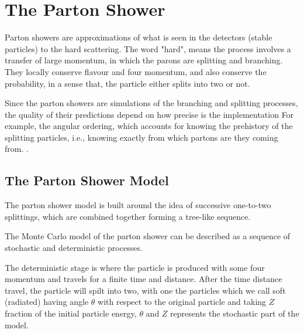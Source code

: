 \chapter{The Parton Shower}

Parton showers are approximations of what is seen in the detectors (stable particles) to the hard scattering. The word "hard", means the process involves a transfer of large momentum, in which the parons are splitting and branching.  
They locally conserve flavour and four momentum, and also conserve the probability, in a sense that, the particle either splits into two or not.
 
Since the parton showers are simulations of the branching and splitting processes, the quality of their predictions depend on how precise is the implementation For example, the angular ordering, which accounts for knowing the prehistory of the splitting particles, i.e.,
knowing exactly from which partons are they coming from. \citep{introduction}.

\section{The Parton Shower Model}\label{qcda}
The parton shower model is built around the idea of successive one-to-two splittings, which are combined together forming a tree-like sequence.

The Monte Carlo model of the parton shower can be described as a sequence of stochastic and deterministic processes. 

The deterministic stage is where the particle is produced with some four momentum and travels for a finite time and distance.
After the time distance travel, the particle will spilt into two,
with one the particles  which we call soft (radiated) having angle $\theta$ with respect to the original particle and taking $Z$ fraction of the initial particle energy, $\theta$ and $Z$ represents the stochastic part of the model.
 
